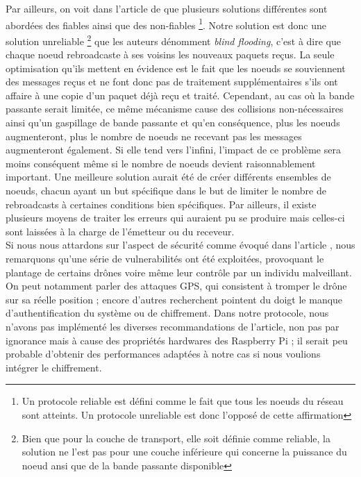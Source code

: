 \documentclass[journal, a4paper]{IEEEtran}
\begin{document}
        Par ailleurs, on voit dans l'article de \cite{2004Mahn} que plusieurs solutions différentes sont abordées des fiables ainsi que des non-fiables \footnote{Un protocole reliable est défini comme le fait que tous les noeuds du réseau sont atteints. Un protocole unreliable est donc l'opposé de cette affirmation}. 
        Notre solution est donc une solution unreliable \footnote{Bien que pour la couche de transport, elle soit définie comme reliable, la solution ne l'est pas pour une couche inférieure qui concerne la puissance du noeud ansi que de la bande passante disponible}
        que les auteurs dénomment \textit{blind flooding}, c'est à dire que chaque noeud rebroadcaste à ses voisins les nouveaux paquets reçus. 
        La seule optimisation qu'ils mettent en évidence est le fait que les noeuds se souviennent des messages reçus et ne font donc pas de traitement supplémentaires s'ils ont affaire à une copie 
        d'un paquet déjà reçu et traité. Cependant, au cas où la bande passante serait limitée, ce même mécanisme cause des collisions non-nécessaires ainsi qu'un gaspillage de bande passante et qu'en conséquence, plus les noeuds augmenteront, plus 
        le nombre de noeuds ne recevant pas les messages augmenteront également. Si elle tend vers l'infini, l'impact de ce problème sera moins conséquent même si le nombre de noeuds devient raisonnablement important. 
        Une meilleure solution aurait été de créer différents ensembles de noeuds, chacun ayant un but spécifique dans le but de limiter le nombre de rebroadcasts à certaines conditions bien spécifiques.
        Par ailleurs, il existe plusieurs moyens de traiter les erreurs qui auraient pu se produire mais celles-ci sont laissées à la charge de l'émetteur ou du receveur. \\

        Si nous nous attardons sur l'aspect de sécurité comme évoqué dans l'article \cite{domin2016security}, nous remarquons qu'une série de vulnerabilités ont été exploitées, provoquant le plantage de certains drônes voire 
        même leur contrôle par un individu malveillant. On peut notamment parler des attaques GPS, qui consistent à tromper le drône sur sa réelle position ; encore d'autres recherchent pointent du doigt 
        le manque d'authentification du système ou de chiffrement.
        Dans notre protocole, nous n'avons pas implémenté les diverses recommandations de l'article, non pas par ignorance mais à cause des propriétés hardwares des Raspberry Pi ; 
        il serait peu probable d'obtenir des performances adaptées à notre cas si nous voulions intégrer le chiffrement.
\end{document}
